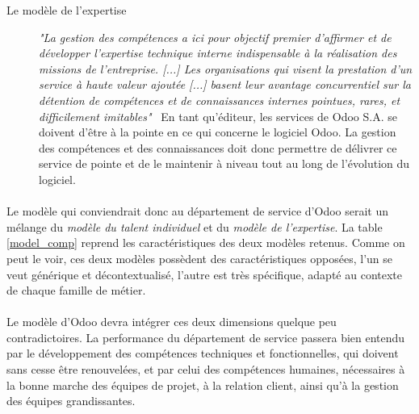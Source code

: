 \begin{description}
  \item[Le modèle de l'expertise]
  \textit{"La gestion des compétences a ici pour objectif premier d'affirmer et de développer l'expertise technique interne indispensable à la réalisation des missions de l'entreprise. [...] Les organisations qui visent la prestation d'un service à haute valeur ajoutée [...] basent leur avantage concurrentiel sur la détention de compétences et de connaissances internes pointues, rares, et difficilement imitables"}~\citep[pp.45]{delobbe} En tant qu'éditeur, les services de Odoo S.A. se doivent d'être à la pointe en ce qui concerne le logiciel Odoo. La gestion des compétences et des connaissances doit donc permettre de délivrer ce service de pointe et de le maintenir à niveau tout au long de l'évolution du logiciel. 
\end{description}


\paragraph{}Le modèle qui conviendrait donc au département de service d'Odoo serait un mélange du \textit{modèle du talent individuel} et du \textit{modèle de l'expertise}. La table \ref{model_comp} reprend les caractéristiques des deux modèles retenus. Comme on peut le voir, ces deux modèles possèdent des caractéristiques opposées, l'un se veut générique et décontextualisé, l'autre est très spécifique, adapté au contexte de chaque famille de métier. 

\paragraph{}Le modèle d'Odoo devra intégrer ces deux dimensions quelque peu contradictoires.
La performance du département de service passera bien entendu par le développement des compétences techniques et fonctionnelles, qui doivent sans cesse être renouvelées, et par celui des compétences humaines, nécessaires à la bonne marche des équipes de projet, à la relation client, ainsi qu'à la gestion des équipes grandissantes.



